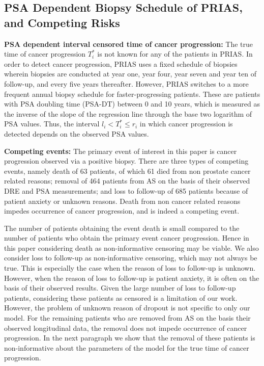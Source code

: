 \subsection{PSA Dependent Biopsy Schedule of PRIAS, and Competing Risks}
\label{subsec:ascertainment_bias}
\textbf{PSA dependent interval censored time of cancer progression:} The true time of cancer progression $T^*_i$ is not known for any of the patients in PRIAS. In order to detect cancer progression, PRIAS uses a fixed schedule of biopsies wherein biopsies are conducted at year one, year four, year seven and year ten of follow-up, and every five years thereafter. However, PRIAS switches to a more frequent annual biopsy schedule for faster-progressing patients. These are patients with PSA doubling time (PSA-DT) between 0 and 10 years, which is measured as the inverse of the slope of the regression line through the base two logarithm of PSA values. Thus, the interval $l_i < T_i^* \leq r_i$ in which cancer progression is detected depends on the observed PSA values. 

\textbf{Competing events:} The primary event of interest in this paper is cancer progression observed via a positive biopsy. There are three types of competing events, namely death of 63 patients, of which 61 died from non prostate cancer related reasons; removal of 464 patients from AS on the basis of their observed DRE and PSA measurements; and loss to follow-up of 685 patients because of patient anxiety or unknown reasons. Death from non cancer related reasons impedes occurrence of cancer progression, and is indeed a competing event. 

The number of patients obtaining the event death is small compared to the number of patients who obtain the primary event cancer progression. Hence in this paper considering death as non-informative censoring may be viable. We also consider loss to follow-up as non-informative censoring, which may not always be true. This is especially the case when the reason of loss to follow-up is unknown. However, when the reason of loss to follow-up is patient anxiety, it is often on the basis of their observed results. Given the large number of loss to follow-up patients, considering these patients as censored is a limitation of our work. However, the problem of unknown reason of dropout is not specific to only our model. For the remaining patients who are removed from AS on the basis their observed longitudinal data, the removal does not impede occurrence of cancer progression. In the next paragraph we show that the removal of these patients is non-informative about the parameters of the model for the true time of cancer progression.

